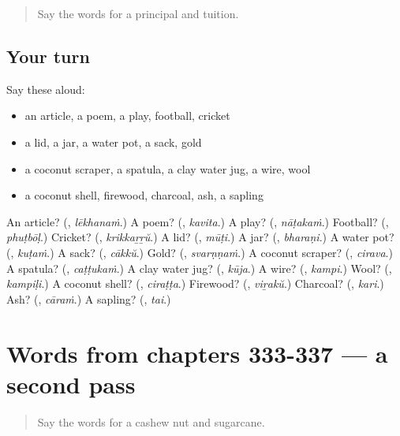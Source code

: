 \begin{quote}
Say the words for a principal and tuition.
\end{quote}

\subsection*{Your turn}
Say these aloud:

\begin{itemize}
\raggedright
  \item an article, a poem, a play, football, cricket
  \item a lid, a jar, a water pot, a sack, gold
  \item a coconut scraper, a spatula, a clay water jug, a wire, wool
  \item a coconut shell, firewood, charcoal, ash, a sapling
\end{itemize}

\begin{tcolorbox}[breakable,colback=teal!4,colframe=teal!35!black,title={Before you move on}]
An article? (\textbf{}, \emph{lēkhanaṁ}.) A poem? (\textbf{}, \emph{kavita}.) A play? (\textbf{}, \emph{nāṭakaṁ}.) Football? (\textbf{}, \emph{phuṭbōḷ}.) Cricket? (\textbf{}, \emph{krikkaṟṟŭ}.) A lid? (\textbf{}, \emph{mūṭi}.) A jar? (\textbf{}, \emph{bharaṇi}.) A water pot? (\textbf{}, \emph{kuṭaṁ}.) A sack? (\textbf{}, \emph{cākkŭ}.) Gold? (\textbf{}, \emph{svarṇṇaṁ}.) A coconut scraper? (\textbf{}, \emph{cirava}.) A spatula? (\textbf{}, \emph{caṭṭukaṁ}.) A clay water jug? (\textbf{}, \emph{kūja}.) A wire? (\textbf{}, \emph{kampi}.) Wool? (\textbf{}, \emph{kampiḷi}.) A coconut shell? (\textbf{}, \emph{ciraṭṭa}.) Firewood? (\textbf{}, \emph{viṟakŭ}.) Charcoal? (\textbf{}, \emph{kari}.) Ash? (\textbf{}, \emph{cāraṁ}.) A sapling? (\textbf{}, \emph{tai}.)
\end{tcolorbox}
\section[(dialogue)]{Words from chapters 333-337 — a second pass}

\label{lesson:ML-R337-second-pass-words-from-chapters-333-337}



\begin{quote}
Say the words for a cashew nut and sugarcane.
\end{quote}

